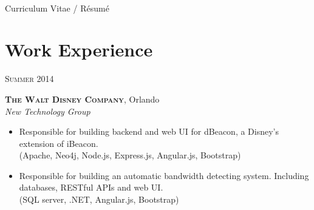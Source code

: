 \documentclass[10pt]{article}
\begin{document}
\color{text1} %


\par{\\[8pt] %
{\color{headings} Curriculum {Vitae / Résumé}\\[15pt]\par} %
	

\begin{minipage}[t]{0.5\textwidth} %
\vspace{0pt} %
	

\section{Work Experience} 

{\raggedleft\textsc{Summer 2014}\par}

{\raggedright\large \textbf{\textsc{The Walt Disney Company}}, Orlando\\
\textit{New Technology Group}\\[5pt]}

\begin{itemize}
	\item Responsible for building backend and web UI for dBeacon, a Disney's extension of iBeacon. \\
	{\color{Mahogany}(Apache, Neo4j, Node.js, Express.js, Angular.js, Bootstrap)}
	\item Responsible for building an automatic bandwidth detecting system. Including databases, RESTful APIs and web UI. \\
	{\color{Mahogany}(SQL server, .NET, Angular.js, Bootstrap)}
\end{itemize}


\end{minipage}}
\end{document}
